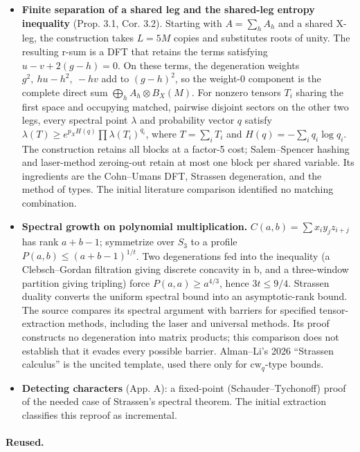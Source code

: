 \documentclass[11pt]{article}
\begin{document}
\begin{itemize}
\item \textbf{Finite separation of a shared leg and the shared-leg entropy inequality} (Prop. 3.1, Cor. 3.2). Starting with $A=\sum_hA_h$ and a shared X-leg, the construction takes $L=5M$ copies and substitutes roots of unity. The resulting r-sum is a DFT that retains the terms satisfying $u-v+2(g-h)=0$. On these terms, the degeneration weights $g^2,\ hu-h^2,\ -hv$ add to $(g-h)^2$, so the weight-0 component is the complete direct sum $\bigoplus_hA_h\otimes B_X(M)$. For nonzero tensors $T_i$ sharing the first space and occupying matched, pairwise disjoint sectors on the other two legs, every spectral point $\lambda$ and probability vector $q$ satisfy $\lambda(T)\ge e^{p_XH(q)}\prod\lambda(T_i)^{q_i}$, where $T=\sum_iT_i$ and $H(q)=-\sum_iq_i\log q_i$. The construction retains all blocks at a factor-5 cost; Salem--Spencer hashing and laser-method zeroing-out retain at most one block per shared variable. Its ingredients are the Cohn--Umans DFT, Strassen degeneration, and the method of types. The initial literature comparison identified no matching combination.
\item \textbf{Spectral growth on polynomial multiplication.} $C(a,b)=\sum x_iy_jz_{i+j}$ has rank $a+b-1$; symmetrize over $S_3$ to a profile $P(a,b)\le(a+b-1)^{1/t}$. Two degenerations fed into the inequality (a Clebsch--Gordan filtration giving discrete concavity in b, and a three-window partition giving tripling) force $P(a,a)\ge a^{4/3}$, hence $3t\le9/4$. Strassen duality converts the uniform spectral bound into an asymptotic-rank bound. The source compares its spectral argument with barriers for specified tensor-extraction methods, including the laser and universal methods. Its proof constructs no degeneration into matrix products; this comparison does not establish that it evades every possible barrier. Alman--Li's 2026 ``Strassen calculus'' is the uncited template, used there only for $\mathrm{cw}_q$-type bounds.
\item \textbf{Detecting characters} (App. A): a fixed-point (Schauder--Tychonoff) proof of the needed case of Strassen's spectral theorem. The initial extraction classifies this reproof as incremental.
\end{itemize}

\paragraph{Reused.}
\end{document}
